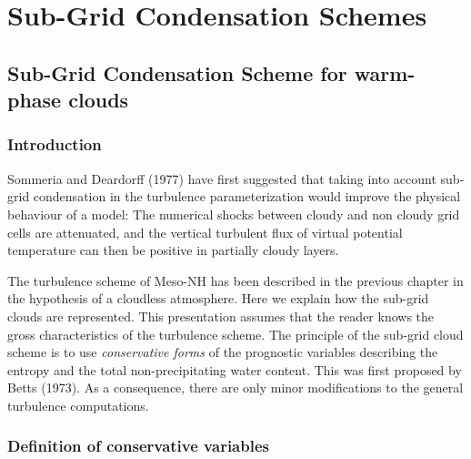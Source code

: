\chapter{Sub-Grid Condensation Schemes}
\minitoc

\section{Sub-Grid Condensation Scheme for warm-phase clouds}


\subsection{Introduction}

Sommeria and Deardorff (1977) have first suggested that taking into account
sub-grid condensation in the turbulence parameterization
would improve the physical behaviour of a model:
The numerical shocks between cloudy
and non cloudy grid cells are attenuated, and the vertical turbulent flux
of virtual potential temperature can then be positive in partially
cloudy layers.

The turbulence scheme of Meso-NH has been described in the previous chapter
in the hypothesis of a cloudless atmosphere.  Here we explain how the sub-grid
clouds are represented. This presentation assumes that the reader knows
the gross characteristics of the turbulence scheme. The principle of the
sub-grid cloud scheme is to use {\em conservative forms} of the prognostic
variables describing the entropy and the total non-precipitating water
content. This was first proposed by Betts (1973). As a consequence, there
are only minor modifications to the general turbulence computations.

\subsection{Definition of conservative variables}

